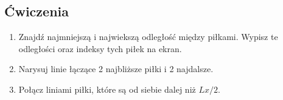 \documentclass{instrukcja}
\begin{document}
\subsection*{Ćwiczenia}
\begin{enumerate}
\item Znajdź najmniejszą i najwiekszą odległość między piłkami. Wypisz te odległości oraz indeksy tych piłek na ekran.
\item Narysuj linie łączące 2 najbliższe piłki i 2 najdalsze.
\item Połącz liniami piłki, które są od siebie dalej niż \( Lx/2\).

\end{enumerate}
\end{document}
